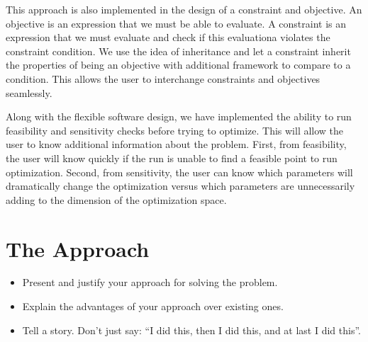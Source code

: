 \documentclass[10pt]{article}
\begin{document}
This approach is also implemented in the design of a constraint and objective. An objective is an expression that we must be able to evaluate. A constraint is an expression that we must evaluate and check if this evaluationa violates the constraint condition. We use the idea of inheritance and let a constraint inherit the properties of being an objective with additional framework to compare to a condition. This allows the user to interchange constraints and objectives seamlessly.

Along with the flexible software design, we have implemented the ability to run feasibility and sensitivity checks before trying to optimize. This will allow the user to know additional information about the problem. First, from feasibility, the user will know quickly if the run is unable to find a feasible point to run optimization. Second, from sensitivity, the user can know which parameters will dramatically change the optimization versus which parameters are unnecessarily adding to the dimension of the optimization space. 
 

\section{The Approach}
\begin{itemize}
\item Present and justify your approach for solving the problem. 
\item Explain the advantages of your approach over existing ones.

\item Tell a story.
Don't just say: ``I did this, then I did this, and at last I did this''.
\end{itemize}
\newpage
\end{document}
